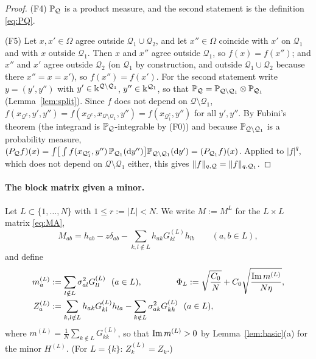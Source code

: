 \begin{proof}
(F4) $\mathbb{P}_{\mathcal Q}$ is a product measure, and the second statement is the definition \eqref{eq:PQ}.

(F5) Let $x,x'\in\Omega$ agree outside $\mathcal Q_1\cup\mathcal Q_2$, and let $x''\in\Omega$ coincide with $x'$ on $\mathcal Q_1$ and with $x$ outside $\mathcal Q_1$. Then $x$ and $x''$ agree outside $\mathcal Q_1$,
so $f(x)=f(x'')$; and $x''$ and $x'$ agree outside $\mathcal Q_2$ (on $\mathcal Q_1$ by construction, and outside $\mathcal Q_1\cup\mathcal Q_2$ because there $x''=x=x'$), so $f(x'')=f(x')$.
For the second statement write $y=(y',y'')$ with $y'\in\Bbbk^{\mathcal Q\setminus\mathcal Q_1}$, $y''\in\Bbbk^{\mathcal Q_1}$, so that $\mathbb{P}_{\mathcal Q}=\mathbb{P}_{\mathcal Q\setminus\mathcal Q_1}\otimes\mathbb{P}_{\mathcal Q_1}$ (Lemma~\ref{lem:split}).
Since $f$ does not depend on $\mathcal Q\setminus\mathcal Q_1$, $f(x_{\mathcal Q^c},y',y'')=f(x_{\mathcal Q^c},x_{\mathcal Q\setminus\mathcal Q_1},y'')=f(x_{\mathcal Q_1^c},y'')$ for all $y',y''$. By Fubini's theorem (the integrand is $\mathbb{P}_{\mathcal Q}$-integrable by (F0))
and because $\mathbb{P}_{\mathcal Q\setminus\mathcal Q_1}$ is a probability measure,
$(P_{\mathcal Q}f)(x)=\int\!\big[\int f(x_{\mathcal Q_1^c},y'')\,\mathbb{P}_{\mathcal Q_1}(\mathrm{d} y'')\big]\mathbb{P}_{\mathcal Q\setminus\mathcal Q_1}(\mathrm{d} y')=(P_{\mathcal Q_1}f)(x)$.
Applied to $|f|^q$, which does not depend on $\mathcal Q\setminus\mathcal Q_1$ either, this gives $\|f\|_{q,\mathcal Q}=\|f\|_{q,\mathcal Q_1}$.
\end{proof}

\paragraph{The block matrix given a minor.} Let $L\subset\{1,\dots,N\}$ with $1\le r:=|L|<N$. We write $M:=M^L$ for the $L\times L$ matrix \eqref{eq:MA},
\begin{equation}\label{eq:ML}
 M_{ab}=h_{ab}-z\delta_{ab}-\sum_{k,l\notin L}h_{ak}G^{(L)}_{kl}h_{lb}\qquad(a,b\in L),
\end{equation}
and define
\begin{equation}\label{eq:PhiL}
\begin{aligned}
 m^{(L)}_a&:=\sum_{l\notin L}\sigma_{al}^2G^{(L)}_{ll}\ \ (a\in L),\qquad\qquad\Phi_L:=\sqrt{\frac{C_0}N}+C_0\sqrt{\frac{\operatorname{Im} m^{(L)}}{N\eta}},\\
 Z^{(L)}_a&:=\sum_{k,l\notin L}h_{ak}G^{(L)}_{kl}h_{la}-\sum_{k\notin L}\sigma_{ak}^2G^{(L)}_{kk}\ \ (a\in L),
\end{aligned}
\end{equation}
where $m^{(L)}=\frac1N\sum_{k\notin L}G^{(L)}_{kk}$, so that $\operatorname{Im} m^{(L)}>0$ by Lemma~\ref{lem:basic}(a) for the minor $H^{(L)}$. (For $L=\{k\}$: $Z^{(L)}_k=Z_k$.)

